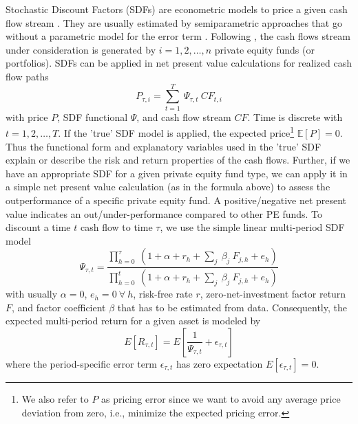 \documentclass[12pt]{article}
\begin{document}
Stochastic Discount Factors (SDFs) are econometric models to price a given cash flow stream \citep{HR87}.
They are usually estimated by semiparametric approaches that go without a parametric model for the error term \citep{F19}.
Following \cite{DLP12}, the cash flows stream under consideration is generated by $i=1,2,\dots,n$ private equity funds (or portfolios).
SDFs can be applied in net present value calculations for realized cash flow paths
\begin{equation}
\label{eq:pricing_error}
P_{\tau, i} =
\sum_{t=1}^{T}\ \Psi_{\tau, t}\ {CF}_{t, i}
\end{equation}
with price $P$, SDF functional $\Psi$, and cash flow stream $CF$. 
Time is discrete with $t=1,2,\dots,T$.
If the 'true' SDF model is applied, the expected price\footnote{We also refer to $P$ as pricing error since we want to avoid any average price deviation from zero, i.e., minimize the expected pricing error.} $\mathbb{E}[P]=0$. 
Thus the functional form and explanatory variables used in the 'true' SDF explain or describe the risk and return properties of the cash flows. 
Further, if we have an appropriate SDF for a given private equity fund type, we can apply it in a simple net present value calculation (as in the formula above) to assess the outperformance of a specific private equity fund. 
A positive/negative net present value indicates an out/under-performance compared to other PE funds.
To discount a time $t$ cash flow to time $\tau$, we use the simple linear multi-period SDF model
\begin{equation}
\label{eq:linear_sdf}
\Psi_{\tau,t} =
\frac{
	\prod_{h=0}^{\tau}\ \left(1 + \alpha + r_{h} + \sum_j\ \beta_j\ F_{j,h} + e_h \right)
}{
	\prod_{h=0}^{t}\ \left(1+ \alpha + r_{h} + \sum_j\ \beta_j\ F_{j,h} + e_h \right)
}
\end{equation}
with usually $\alpha=0$, $e_h=0 \ \forall \ h$, risk-free rate $r$, zero-net-investment factor return $F$, and factor coefficient $\beta$ that has to be estimated from data. 
Consequently, the expected multi-period return for a given asset is modeled by
\[
E \left[R_{\tau,t} \right] = 
E \left[ \frac{1}{\Psi_{\tau,t}} + \epsilon_{\tau,t} \right]
\]
where the period-specific error term $\epsilon_{\tau,t}$ has zero expectation $E[\epsilon_{\tau,t}]=0$.
\end{document}
